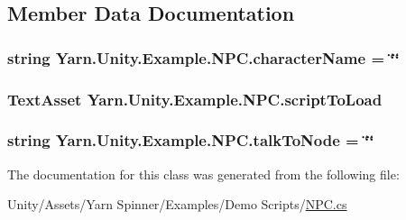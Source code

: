 \subsection{Member Data Documentation}
\hypertarget{a00057_a418ea7095bd8201559ed392f07905ca3}{
\subsubsection[{character\-Name}]{\setlength{\rightskip}{0pt plus 5cm}string Yarn.\-Unity.\-Example.\-N\-P\-C.\-character\-Name = \char`\"{}\char`\"{}}}\label{a00057_a418ea7095bd8201559ed392f07905ca3}
\hypertarget{a00057_a63145fb6ddf357e604d71bac04ca8a60}{
\subsubsection[{script\-To\-Load}]{\setlength{\rightskip}{0pt plus 5cm}Text\-Asset Yarn.\-Unity.\-Example.\-N\-P\-C.\-script\-To\-Load}}\label{a00057_a63145fb6ddf357e604d71bac04ca8a60}
\hypertarget{a00057_a64f4f1fb66b2046a674e3ebf3b9fdb56}{
\subsubsection[{talk\-To\-Node}]{\setlength{\rightskip}{0pt plus 5cm}string Yarn.\-Unity.\-Example.\-N\-P\-C.\-talk\-To\-Node = \char`\"{}\char`\"{}}}\label{a00057_a64f4f1fb66b2046a674e3ebf3b9fdb56}


The documentation for this class was generated from the following file\-:\begin{DoxyCompactItemize}
\item 
Unity/\-Assets/\-Yarn Spinner/\-Examples/\-Demo Scripts/\hyperlink{a00112}{N\-P\-C.\-cs}\end{DoxyCompactItemize}
